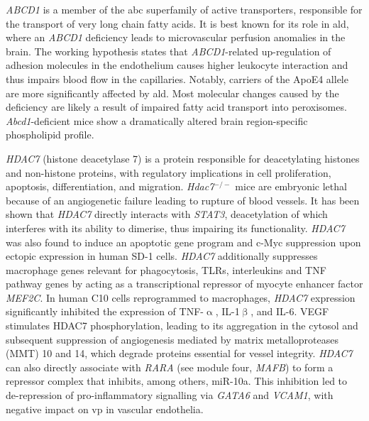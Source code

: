 \emph{ABCD1} is a member of the \ac{abc} superfamily of active transporters, responsible for the transport of very long chain fatty acids.\cite{Hama2018} It is best known for its role in \ac{ald}, where an \emph{ABCD1} deficiency leads to microvascular perfusion anomalies in the brain.\cite{Lauer2017} The working hypothesis states that \emph{ABCD1}-related up-regulation of adhesion molecules in the endothelium causes higher leukocyte interaction and thus impairs blood flow in the capillaries. Notably, carriers of the ApoE4 allele are more significantly affected by \ac{ald}.\cite{Orchard2019} Most molecular changes caused by the deficiency are likely a result of impaired fatty acid transport into peroxisomes. \emph{Abcd1}-deficient mice show a dramatically altered brain region-specific phospholipid profile.\cite{Hama2018}

\emph{HDAC7} (histone deacetylase 7) is a protein responsible for deacetylating histones and non-histone proteins, with regulatory implications in cell proliferation, apoptosis, differentiation, and migration.\cite{Lei2017} \emph{Hdac7}$^{-/-}$ mice are embryonic lethal because of an angiogenetic failure leading to rupture of blood vessels.\cite{Chang2006} It has been shown that \emph{HDAC7} directly interacts with \emph{STAT3}, deacetylation of which interferes with its ability to dimerise, thus impairing its functionality.\cite{Peixoto2016,Lei2017} \emph{HDAC7} was also found to induce an apoptotic gene program and c-Myc suppression upon ectopic expression in human SD-1 cells.\cite{Barneda-Zahonero2015} \emph{HDAC7} additionally suppresses macrophage genes relevant for phagocytosis, TLRs, interleukins and TNF pathway genes by acting as a transcriptional repressor of myocyte enhancer factor \emph{MEF2C}.\cite{Barneda-Zahonero2013} In human C10 cells reprogrammed to macrophages, \emph{HDAC7} expression significantly inhibited the expression of TNF-$\upalpha$, IL-1$\upbeta$, and IL-6.\cite{Barneda-Zahonero2013} VEGF stimulates HDAC7 phosphorylation, leading to its aggregation in the cytosol and subsequent suppression of angiogenesis mediated by matrix metalloproteases (MMT) 10 and 14, which degrade proteins essential for vessel integrity.\cite{Miano2006,Ha2008} \emph{HDAC7} can also directly associate with \emph{RARA} (see module four, \emph{MAFB}) to form a repressor complex that inhibits, among others, miR-10a.\cite{Lee2017} This inhibition led to de-repression of pro-inflammatory signalling via \emph{GATA6} and \emph{VCAM1}, with negative impact on \ac{vp} in vascular endothelia.
 
